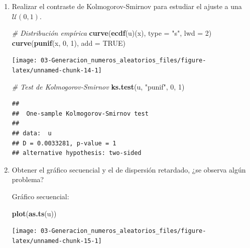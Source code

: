 \documentclass[]{book}
\newenvironment{Shaded}{\begin{snugshade}}{\end{snugshade}}
\newcommand{\KeywordTok}[1]{\textcolor[rgb]{0.13,0.29,0.53}{\textbf{#1}}}
\newcommand{\DataTypeTok}[1]{\textcolor[rgb]{0.13,0.29,0.53}{#1}}
\newcommand{\DecValTok}[1]{\textcolor[rgb]{0.00,0.00,0.81}{#1}}
\newcommand{\StringTok}[1]{\textcolor[rgb]{0.31,0.60,0.02}{#1}}
\newcommand{\CommentTok}[1]{\textcolor[rgb]{0.56,0.35,0.01}{\textit{#1}}}
\newcommand{\OtherTok}[1]{\textcolor[rgb]{0.56,0.35,0.01}{#1}}
\newcommand{\NormalTok}[1]{#1}
\theoremstyle{definition}
\theoremstyle{definition}
\theoremstyle{definition}
\theoremstyle{remark}
\begin{document}
\begin{enumerate}
\def\labelenumi{\alph{enumi})}
\item
  Realizar el contraste de Kolmogorov-Smirnov para estudiar el ajuste a
  una \(\mathcal{U}(0,1)\).

\begin{Shaded}
\begin{Highlighting}[]
\CommentTok{# Distribución empírica}
\KeywordTok{curve}\NormalTok{(}\KeywordTok{ecdf}\NormalTok{(u)(x), }\DataTypeTok{type =} \StringTok{"s"}\NormalTok{, }\DataTypeTok{lwd =} \DecValTok{2}\NormalTok{)}
\KeywordTok{curve}\NormalTok{(}\KeywordTok{punif}\NormalTok{(x, }\DecValTok{0}\NormalTok{, }\DecValTok{1}\NormalTok{), }\DataTypeTok{add =} \OtherTok{TRUE}\NormalTok{)}
\end{Highlighting}
\end{Shaded}

  \begin{center}\texttt{[image: 03-Generacion\_numeros\_aleatorios\_files/figure-latex/unnamed-chunk-14-1]} \end{center}

\begin{Shaded}
\begin{Highlighting}[]
\CommentTok{# Test de Kolmogorov-Smirnov}
\KeywordTok{ks.test}\NormalTok{(u, }\StringTok{"punif"}\NormalTok{, }\DecValTok{0}\NormalTok{, }\DecValTok{1}\NormalTok{)}
\end{Highlighting}
\end{Shaded}

\begin{verbatim}
## 
##  One-sample Kolmogorov-Smirnov test
## 
## data:  u
## D = 0.0033281, p-value = 1
## alternative hypothesis: two-sided
\end{verbatim}
\item
  Obtener el gráfico secuencial y el de dispersión retardado, ¿se
  observa algún problema?

  Gráfico secuencial:

\begin{Shaded}
\begin{Highlighting}[]
\KeywordTok{plot}\NormalTok{(}\KeywordTok{as.ts}\NormalTok{(u))}
\end{Highlighting}
\end{Shaded}

  \begin{center}\texttt{[image: 03-Generacion\_numeros\_aleatorios\_files/figure-latex/unnamed-chunk-15-1]} \end{center}


\end{enumerate}
\end{document}
